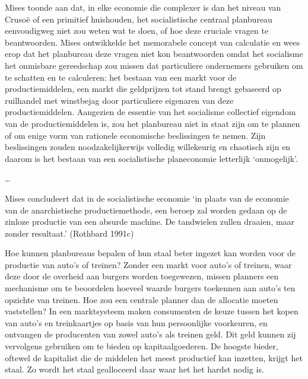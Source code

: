 \documentclass[
  a5paper,
  smalldemyvopaper,11pt,twoside,onecolumn,openright,extrafontsizes,
hidelinks]{memoir}
\begin{document}
Mises toonde aan dat, in elke economie die complexer is dan het niveau
van Crusoë of een primitief huishouden, het socialistische centraal
planbureau eenvoudigweg niet zou weten wat te doen, of hoe deze cruciale
vragen te beantwoorden. Mises ontwikkelde het memorabele concept van
calculatie en wees erop dat het planbureau deze vragen niet kon
beantwoorden omdat het socialisme het onmisbare gereedschap zou missen
dat particuliere ondernemers gebruiken om te schatten en te calculeren:
het bestaan van een markt voor de productiemiddelen, een markt die
geldprijzen tot stand brengt gebaseerd op ruilhandel met winstbejag door
particuliere eigenaren van deze productiemiddelen. Aangezien de essentie
van het socialisme collectief eigendom van de productiemiddelen is, zou
het planbureau niet in staat zijn om te plannen of om enige vorm van
rationele economische beslissingen te nemen. Zijn beslissingen zouden
noodzakelijkerwijs volledig willekeurig en chaotisch zijn en daarom is
het bestaan van een socialistische planeconomie letterlijk `onmogelijk'.

\ldots{}

Mises concludeert dat in de socialistische economie `in plaats van de
economie van de anarchistische productiemethode, een beroep zal worden
gedaan op de zinloze productie van een absurde machine. De tandwielen
zullen draaien, maar zonder resultaat.' (Rothbard 1991c)

Hoe kunnen planbureaus bepalen of hun staal beter ingezet kan worden
voor de productie van auto's of treinen? Zonder een markt voor auto's of
treinen, waar deze door de overheid aan burgers worden toegewezen,
missen planners een mechanisme om te beoordelen hoeveel waarde burgers
toekennen aan auto's ten opzichte van treinen. Hoe zou een centrale
planner dan de allocatie moeten vaststellen? In een marktsysteem maken
consumenten de keuze tussen het kopen van auto's en treinkaartjes op
basis van hun persoonlijke voorkeuren, en ontvangen de producenten van
zowel auto's als treinen geld. Dit geld kunnen zij vervolgens gebruiken
om te bieden op kapitaalgoederen. De hoogste bieder, oftewel de
kapitalist die de middelen het meest productief kan inzetten, krijgt het
staal. Zo wordt het staal gealloceerd daar waar het het hardst nodig is.
\end{document}
